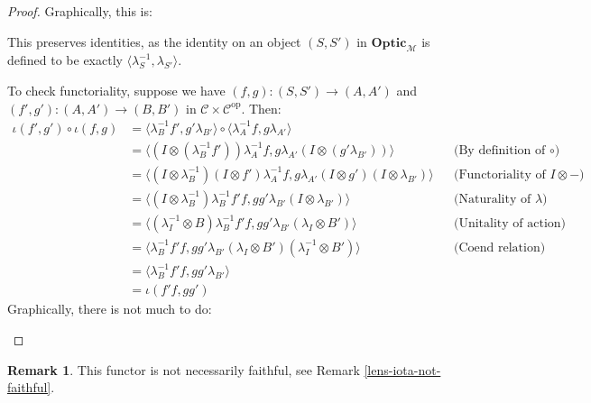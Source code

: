 \documentclass[11pt,a4paper]{article}
\theoremstyle{plain}
\theoremstyle{definition}
\newtheorem{remark}[theorem]{Remark}
\newcommand{\C}{\mathscr{C}}
\newcommand{\M}{\mathscr{M}}
\newcommand{\Optic}{\mathbf{Optic}}
\newcommand{\op}{\mathrm{op}}
\newcommand{\todo}[1]{\textcolor{red}{\small #1}}
\begin{document}
\begin{proof}
Graphically, this is:
\begin{center}

\end{center}

This preserves identities, as the identity on an object $(S, S')$ in $\Optic_\M$ is defined to be exactly $\langle \lambda^{-1}_S, \lambda_{S'} \rangle$.

To check functoriality, suppose we have $(f, g) : (S, S') \to (A, A')$ and $(f', g') : (A, A') \to (B, B')$ in $\C \times \C^\op$. Then:
\begin{align*}
\iota(f', g') \circ \iota(f, g) 
&= \langle \lambda^{-1}_B f', g' \lambda_{B'} \rangle \circ \langle \lambda^{-1}_A f, g \lambda_{A'} \rangle \\
&= \langle (I\otimes (\lambda^{-1}_B f'))\lambda^{-1}_A f, g \lambda_{A'} (I\otimes (g' \lambda_{B'}))\rangle && \text{(By definition of $\circ$)}\\
&= \langle (I \otimes \lambda^{-1}_B) (I \otimes f')\lambda^{-1}_A f, g \lambda_{A'} (I \otimes g')(I\otimes \lambda_{B'})\rangle && \text{(Functoriality of $I \otimes -$)}\\
&= \langle (I\otimes \lambda^{-1}_B) \lambda^{-1}_B f' f, g g' \lambda_{B'} (I\otimes \lambda_{B'})\rangle && \text{(Naturality of $\lambda$)}\\
&= \langle (\lambda^{-1}_I \otimes B) \lambda^{-1}_B f' f, g g' \lambda_{B'} (\lambda_I \otimes B')\rangle && \text{(Unitality of action)} \\
&= \langle \lambda^{-1}_B f' f, g g' \lambda_{B'} (\lambda_I \otimes B') (\lambda^{-1}_I \otimes B') \rangle && \text{(Coend relation)}  \\
&= \langle \lambda^{-1}_B f'f, g g' \lambda_{B'} \rangle \\
&= \iota(f'f, gg')
\end{align*}
Graphically, there is not much to do:
\begin{center}

\qquad \raisebox{0.3cm}{$=$} \qquad 

\end{center}

\end{proof}

\begin{remark}
This functor is not necessarily faithful, see Remark \ref{lens-iota-not-faithful}.
\end{remark}

\end{document}
